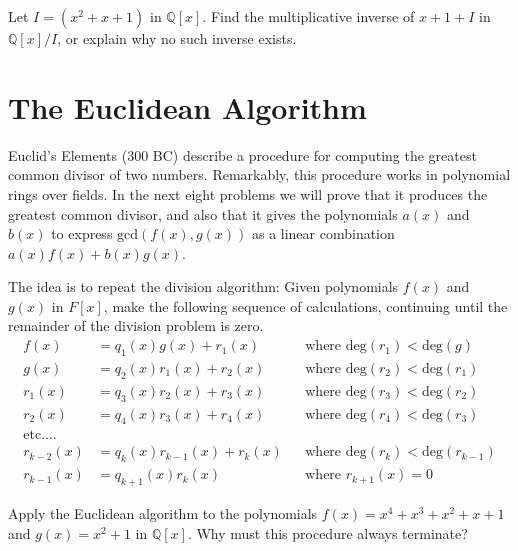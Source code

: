 \begin{problem}\label{prob:findinvqr}
Let \(I = (x^2+x+1)\) in \(\mathbb{Q}[x]\). Find the multiplicative inverse of \(x+1 +I\) in \(\mathbb{Q}[x]/I\), or explain why no such inverse exists.
\end{problem}

\section{The Euclidean Algorithm}

Euclid's Elements (300 BC) describe a procedure for computing the greatest common divisor of two numbers. Remarkably, this procedure works in polynomial rings over fields. In the next eight problems we will prove that it produces the greatest common divisor, and also that it gives the polynomials \(a(x)\) and \(b(x)\) to express \(\mbox{gcd}(f(x),g(x))\) as a linear combination \(a(x)f(x) + b(x)g(x)\).

The idea is to repeat the division algorithm: Given polynomials \(f(x)\) and \(g(x)\) in \(F[x]\), make the following sequence of calculations, continuing until the remainder of the division problem is zero.
\begin{align*}
f(x) & = q_1(x)g(x) + r_1(x) && \text{where } \mbox{deg}(r_1)<\mbox{deg}(g) \\
g(x) & = q_2(x)r_1(x) + r_2(x) && \text{where } \mbox{deg}(r_2)<\mbox{deg}(r_1) \\
r_1(x) & = q_3(x)r_2(x) + r_3(x) && \text{where } \mbox{deg}(r_3)<\mbox{deg}(r_2) \\
r_2(x) & = q_4(x)r_3(x) + r_4(x) && \text{where } \mbox{deg}(r_4)<\mbox{deg}(r_3) \\
\text{etc.}\ldots \\
r_{k-2}(x) & = q_k(x)r_{k-1}(x) + r_k(x) && \text{where } \mbox{deg}(r_k)<\mbox{deg}(r_{k-1}) \\
r_{k-1}(x) & = q_{k+1}(x)r_k(x) && \text{where } r_{k+1}(x) = 0
\end{align*}

\begin{problem}
Apply the Euclidean algorithm to the polynomials \(f(x) = x^4+x^3+x^2+x+1\) and \(g(x)=x^2+1\) in \(\mathbb{Q}[x]\). Why must this procedure always terminate?
\end{problem}

